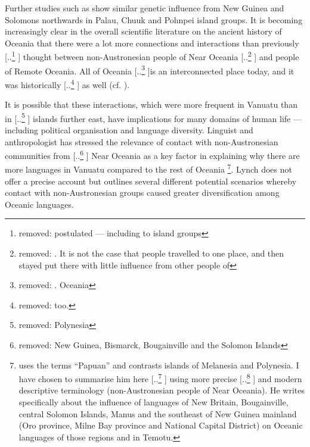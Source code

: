 \documentclass[unnumsec,webpdf,modern,medium]{oup-authoring-template}
\providecommand{\DIFaddtex}[1]{{\protect\color{blue} \sf #1}} %
\providecommand{\DIFdeltex}[1]{{\protect\color{red} [..\footnote{removed: #1} ]}} %
\providecommand{\DIFaddbegin}{} %
\providecommand{\DIFaddend}{} %
\providecommand{\DIFdelbegin}{} %
\providecommand{\DIFdelend}{} %
\providecommand{\DIFadd}[1]{\texorpdfstring{\DIFaddtex{#1}}{#1}} %
\providecommand{\DIFdel}[1]{\texorpdfstring{\DIFdeltex{#1}}{}} %
\newcommand{\DIFscaledelfig}{0.5}
\newlength{\DIFdelgraphicswidth} %
\newlength{\DIFdelgraphicsheight} %
\newcommand{\DIFaddincludegraphics}[2][]{{\color{blue}\fbox{\DIFOincludegraphics[#1]{#2}}}} %
\newcommand{\DIFdelincludegraphics}[2][]{%
\sbox{\DIFdelgraphicsbox}{\DIFOincludegraphics[#1]{#2}}%
\settoboxwidth{\DIFdelgraphicswidth}{\DIFdelgraphicsbox} %
\settoboxtotalheight{\DIFdelgraphicsheight}{\DIFdelgraphicsbox} %
\scalebox{\DIFscaledelfig}{%
\parbox[b]{\DIFdelgraphicswidth}{\usebox{\DIFdelgraphicsbox}\\[-\baselineskip] \rule{\DIFdelgraphicswidth}{0em}}\llap{\resizebox{\DIFdelgraphicswidth}{\DIFdelgraphicsheight}{%
\setlength{\unitlength}{\DIFdelgraphicswidth}%
\begin{picture}(1,1)%
\thicklines\linethickness{2pt} %
{\color[rgb]{1,0,0}\put(0,0){\framebox(1,1){}}}%
{\color[rgb]{1,0,0}\put(0,0){\line( 1,1){1}}}%
{\color[rgb]{1,0,0}\put(0,1){\line(1,-1){1}}}%
\end{picture}%
}\hspace*{3pt}}} %
} %
\DeclareRobustCommand{\DIFaddbegin}{\DIFOaddbegin \let\includegraphics\DIFaddincludegraphics} %
\DeclareRobustCommand{\DIFaddend}{\DIFOaddend \let\includegraphics\DIFOincludegraphics} %
\DeclareRobustCommand{\DIFdelbegin}{\DIFOdelbegin \let\includegraphics\DIFdelincludegraphics} %
\DeclareRobustCommand{\DIFdelend}{\DIFOaddend \let\includegraphics\DIFOincludegraphics} %
\begin{document}
\DIFadd{Further }\DIFaddend studies such as \citet{liu2022ancient} show similar genetic influence from New Guinea and Solomons northwards in Palau, Chuuk and Pohnpei island groups. It is becoming increasingly clear in the overall scientific literature on the ancient history of Oceania that there were a lot more connections and interactions than previously \DIFdelbegin \DIFdel{postulated --- including to island groups }\DIFdelend \DIFaddbegin \DIFadd{thought between non-Austronesian people }\DIFaddend of Near Oceania \DIFdelbegin \DIFdel{. It is not the case that people travelled to one place, and then stayed put there with little influence from other people of }\DIFdelend \DIFaddbegin \DIFadd{and people of Remote Oceania. All of }\DIFaddend Oceania \DIFdelbegin \DIFdel{. Oceania }\DIFdelend is an interconnected place today, and it was historically \DIFdelbegin \DIFdel{too. }\DIFdelend \DIFaddbegin \DIFadd{as well (cf. \citet{hauofa_1993}).
}\DIFaddend 

It is possible that these interactions, which were more frequent in Vanuatu than in \DIFdelbegin \DIFdel{Polynesia}\DIFdelend \DIFaddbegin \DIFadd{islands further east}\DIFaddend , have implications for many domains of human life --- including political organisation and language diversity. Linguist and anthropologist \citet[104]{lynch1981melanesian} has stressed the relevance of contact with non-Austronesian communities from \DIFdelbegin \DIFdel{New Guinea, Bismarck, Bougainville and the Solomon Islands }\DIFdelend \DIFaddbegin \DIFadd{Near Oceania }\DIFaddend as a key factor in explaining why there are more languages in Vanuatu compared to the rest of Oceania \footnote{\citet{lynch1981melanesian} uses the terms ``Papuan'' and contrasts \DIFaddbegin \DIFadd{islands of }\DIFaddend Melanesia and Polynesia. I have chosen to summarise him here \DIFdelbegin \DIFdel{in }\DIFdelend \DIFaddbegin \DIFadd{using }\DIFaddend more precise \DIFdelbegin \DIFdel{terms in relation to how his work impacts the current study}\DIFdelend \DIFaddbegin \DIFadd{and modern descriptive terminology (non-Austronesian people of Near Oceania)}\DIFaddend . He writes specifically about the influence of languages of New Britain, Bougainville, central Solomon Islands, Manus and the southeast of New Guinea mainland (Oro province, Milne Bay province and National Capital District) on Oceanic languages of those regions and in Temotu.}. Lynch does not offer a precise account but outlines several different potential scenarios whereby contact with non-Austronesian groups caused greater diversification among Oceanic languages.
\end{document}
